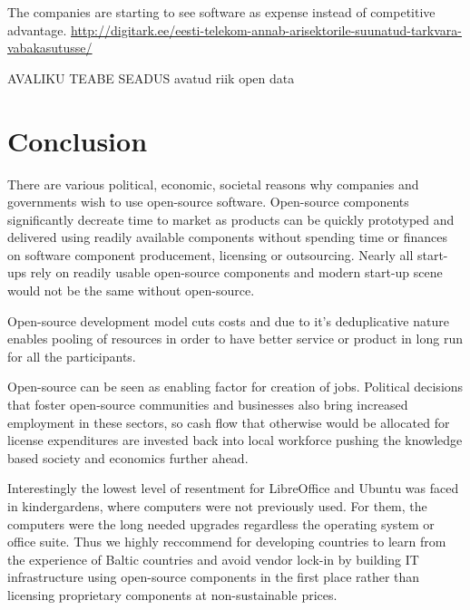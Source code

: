 \documentclass{article}
\begin{document}
The companies are starting to see 
software as expense instead of competitive advantage.
\url{http://digitark.ee/eesti-telekom-annab-arisektorile-suunatud-tarkvara-vabakasutusse/}


AVALIKU TEABE SEADUS
avatud riik
open data


\section{Conclusion}

There are various political, economic, societal reasons why
companies and governments wish to use open-source software.
Open-source components significantly decreate time to market
as products can be quickly prototyped and delivered using
readily available components without spending time or finances on
software component producement, licensing or outsourcing.
Nearly all start-ups rely on readily usable open-source
components and modern start-up scene would not be the same
without open-source.

Open-source development model cuts costs and due to
it's deduplicative nature enables pooling of resources 
in order to have better service or product in long run
for all the participants.


Open-source can be seen as enabling factor for creation of jobs.
Political decisions that foster open-source communities and businesses
also bring increased employment in these sectors,
so cash flow that otherwise would be allocated for
license expenditures
are invested back into local workforce 
pushing the knowledge based society and economics further ahead.

Interestingly the lowest level of resentment for LibreOffice and
Ubuntu was faced in kindergardens,
where computers were not previously used.
For them, the computers were the long needed upgrades
regardless the operating system or office suite.
Thus we highly reccommend for
developing countries to learn from the experience of Baltic countries
and avoid vendor lock-in by building IT infrastructure using
open-source components in the first place
rather than licensing proprietary components
at non-sustainable prices.
\end{document}
